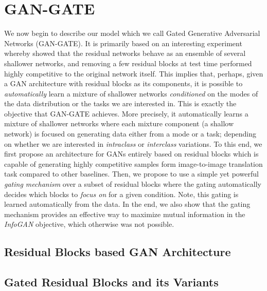 \section{GAN-GATE}
We now begin to describe our model which we call Gated Generative Adversarial Networks (GAN-GATE). It is primarily based on an interesting experiment whereby \cite{veit2016residual} showed that the residual networks behave as an ensemble of several shallower networks, and removing a few residual blocks at test time performed highly competitive to the original network itself. This implies that, perhaps, given a GAN architecture with residual blocks as its components, it is possible to {\em automatically} learn a mixture of shallower networks {\em conditioned} on the modes of the data distribution or the tasks we are interested in. This is exactly the objective that GAN-GATE achieves. More precisely, it automatically learns a mixture of shallower networks where each mixture component (a shallow network) is focused on generating data either from a mode or a task; depending on whether we are interested in {\em intraclass} or {\em interclass} variations. To this end, we first propose an architecture for GANs entirely based on residual blocks which is capable of generating highly competitive samples form image-to-image translation task compared to other baselines. Then, we propose to use a simple yet powerful {\em gating mechanism} over a subset of residual blocks where the gating automatically decides which blocks to {\em focus on} for a given condition. Note, this gating is learned automatically from the data. In the end, we also show that the gating mechanism provides an effective way to maximize mutual information in the {\em InfoGAN} objective, which otherwise was not possible.

\subsection{Residual Blocks based GAN Architecture}
\label{sec:resnet-architecture}
\subsection{Gated Residual Blocks and its Variants}
\label{sec:gated-resnet}

